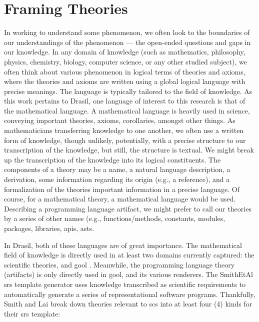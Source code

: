 
\chapter{Framing Theories}
\label{chap:modelkinds}

In working to understand some phenomenon, we often look to the boundaries of our
understandings of the phenomenon — the open-ended questions and gaps in our
knowledge. In any domain of knowledge (such as mathematics, philosophy, physics,
chemistry, biology, computer science, or any other studied subject), we often
think about various phenomenon in logical terms of theories and axioms, where
the theories and axioms are written using a global logical language with precise
meanings. The language is
typically tailored to the field of knowledge. As this work pertains to Drasil,
one language of interest to this research is that of the mathematical language.
A mathematical language is heavily used in science, conveying important
theories, axioms, corollaries, amongst other things. As mathematicians
transferring knowledge to one another, we often use a written form of knowledge,
though unlikely, potentially, with a precise structure to our transcription of
the knowledge, but still, the structure is textual. We might break up the
transcription of the knowledge into its logical constituents. The components of
a theory may be a name, a natural language description, a derivation, some
information regarding its origin (e.g., a reference), and a formalization of the
theories important information in a precise language. Of course, for a
mathematical theory, a mathematical language would be used. Describing a
programming language artifact, we might prefer to call our theories by a series
of other names (e.g., functions/methods, constants, modules, packages,
libraries, \acsp{api}, \acsp{ast}.

In Drasil, both of these languages are of great importance. The mathematical
field of knowledge is directly used in at least two domains currently captured:
the scientific theories, and \acs{gool} \cite{Carette2019}. Meanwhile, the
programming language theory (artifacts) is only directly used in \acs{gool}, and
its various renderers. The SmithEtAl \acs{srs} \cite{SmithAndLai2005} template
generator uses knowledge transcribed as scientific requirements to automatically
generate a series of representational software programs. Thankfully, Smith and
Lai \cite{SmithAndLai2005} break down theories relevant to \acs{scs} into at
least four (4) kinds for their \acs{srs} template:

